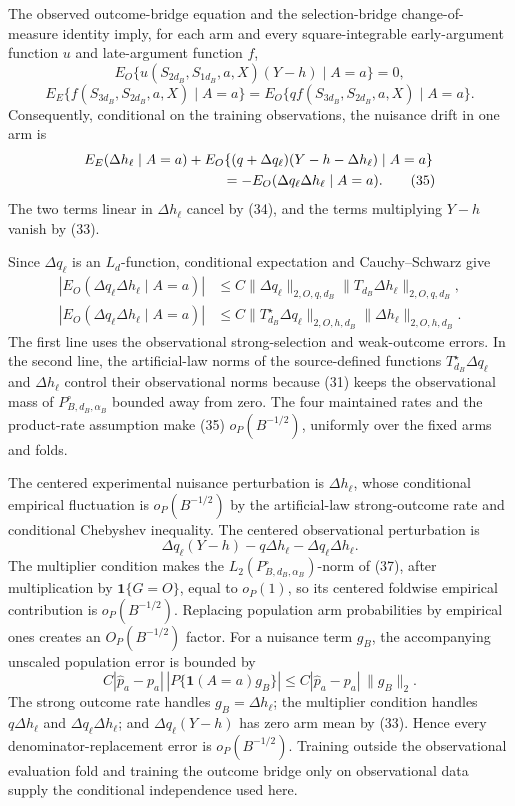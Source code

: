The observed outcome-bridge equation and the selection-bridge change-of-measure identity imply, for each arm and every square-integrable early-argument function \(u\) and late-argument function \(f\),
\[
 E_O\{u(S_{2d_B},S_{1d_B},a,X)(Y-h)\mid A=a\}=0,             \tag{33}
\]
\[
 E_E\{f(S_{3d_B},S_{2d_B},a,X)\mid A=a\}
 =E_O\{qf(S_{3d_B},S_{2d_B},a,X)\mid A=a\}.                 \tag{34}
\]
Consequently, conditional on the training observations, the nuisance drift in one arm is
\[
\begin{aligned}
 &E_E(\Delta h_\ell\mid A=a)
 +E_O\{(q+\Delta q_\ell)(Y-h-\Delta h_\ell)\mid A=a\}\\
 &\hspace{35mm}=-E_O(\Delta q_\ell\Delta h_\ell\mid A=a).   \tag{35}
\end{aligned}
\]
The two terms linear in \(\Delta h_\ell\) cancel by (34), and the terms multiplying \(Y-h\) vanish by (33).

Since \(\Delta q_\ell\) is an \(L_d\)-function, conditional expectation and Cauchy--Schwarz give
\[
\begin{aligned}
 |E_O(\Delta q_\ell\Delta h_\ell\mid A=a)|
 &\le C\|\Delta q_\ell\|_{2,O,q,d_B}
          \|T_{d_B}\Delta h_\ell\|_{2,O,q,d_B},\\
 |E_O(\Delta q_\ell\Delta h_\ell\mid A=a)|
 &\le C\|T_{d_B}^{\star}\Delta q_\ell\|_{2,O,h,d_B}
          \|\Delta h_\ell\|_{2,O,h,d_B}.                   \tag{36}
\end{aligned}
\]
The first line uses the observational strong-selection and weak-outcome errors.  In the second line, the artificial-law norms of the source-defined functions \(T_{d_B}^{\star}\Delta q_\ell\) and \(\Delta h_\ell\) control their observational norms because (31) keeps the observational mass of \(P_{B,d_B,\alpha_B}^{\circ}\) bounded away from zero.  The four maintained rates and the product-rate assumption make (35) \(o_P(B^{-1/2})\), uniformly over the fixed arms and folds.

The centered experimental nuisance perturbation is \(\Delta h_\ell\), whose conditional empirical fluctuation is \(o_P(B^{-1/2})\) by the artificial-law strong-outcome rate and conditional Chebyshev inequality.  The centered observational perturbation is
\[
 \Delta q_\ell(Y-h)-q\Delta h_\ell-\Delta q_\ell\Delta h_\ell. \tag{37}
\]
The multiplier condition makes the \(L_2(P_{B,d_B,\alpha_B}^{\circ})\)-norm of (37), after multiplication by \(\mathbf1\{G=O\}\), equal to \(o_P(1)\), so its centered foldwise empirical contribution is \(o_P(B^{-1/2})\).  Replacing population arm probabilities by empirical ones creates an \(O_P(B^{-1/2})\) factor.  For a nuisance term \(g_B\), the accompanying unscaled population error is bounded by
\[
 C|\widehat p_a-p_a|\,|P\{\mathbf1(A=a)g_B\}|
 \le C|\widehat p_a-p_a|\,\|g_B\|_2.                        \tag{38}
\]
The strong outcome rate handles \(g_B=\Delta h_\ell\); the multiplier condition handles \(q\Delta h_\ell\) and \(\Delta q_\ell\Delta h_\ell\); and \(\Delta q_\ell(Y-h)\) has zero arm mean by (33).  Hence every denominator-replacement error is \(o_P(B^{-1/2})\).  Training outside the observational evaluation fold and training the outcome bridge only on observational data supply the conditional independence used here.

